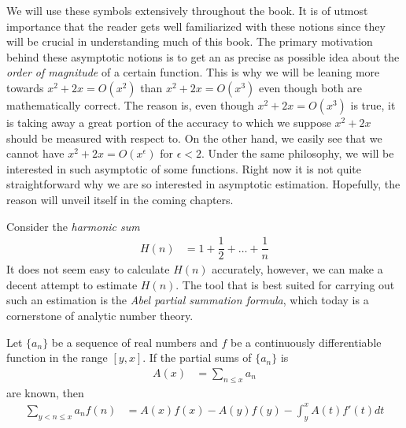 \documentclass[elemannt.tex]{subfile}
\begin{document}
	We will use these symbols extensively throughout the book. It is of utmost importance that the reader gets well familiarized with these notions since they will be crucial in understanding much of this book. The primary motivation behind these asymptotic notions is to get an as precise as possible idea about the \textit{order of magnitude} of a certain function. This is why we will be leaning more towards $x^{2}+2x=O(x^{2})$ than $x^{2}+2x=O(x^{3})$ even though both are mathematically correct. The reason is, even though $x^{2}+2x=O(x^{3})$ is true, it is taking away a great portion of the accuracy to which we suppose $x^{2}+2x$ should be measured with respect to. On the other hand, we easily see that we cannot have $x^{2}+2x=O(x^{\epsilon})$ for $\epsilon<2$. Under the same philosophy, we will be interested in such asymptotic of some functions. Right now it is not quite straightforward why we are so interested in asymptotic estimation. Hopefully, the reason will unveil itself in the coming chapters.
	
	Consider the \textit{harmonic sum}
		\begin{align*}
			H(n)
				& = 1+\dfrac{1}{2}+\ldots+\dfrac{1}{n}
		\end{align*}
	It does not seem easy to calculate $H(n)$ accurately, however, we can make a decent attempt to estimate $H(n)$. The tool that is best suited for carrying out such an estimation is the \textit{Abel partial summation formula}, which today is a cornerstone of analytic number theory.
		\begin{theorem}
			Let $\{a_{n}\}$ be a sequence of real numbers and $f$ be a continuously differentiable function in the range $[y,x]$. If the partial sums of $\{a_{n}\}$ is
				\begin{align*}
					A(x)
						& = \sum_{n\leq x}a_{n}
				\end{align*}
			are known, then
				\begin{align*}
					\sum_{y<n\leq x}a_{n}f(n)
						& = A(x)f(x)-A(y)f(y)-\int_{y}^{x}A(t)f'(t)dt
				\end{align*}
		\end{theorem}
	
\end{document}
